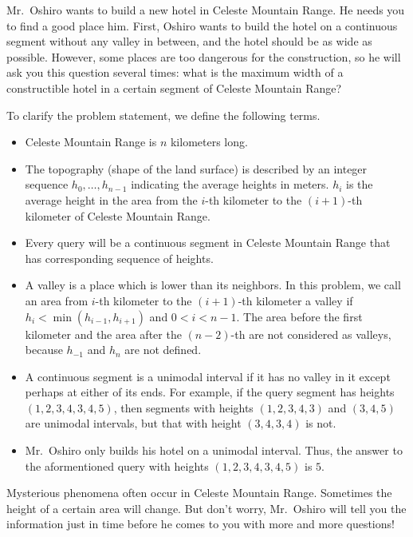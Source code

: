 Mr.\ Oshiro wants to build a new hotel in Celeste Mountain Range.
He needs you to find a good place him. 
First, Oshiro wants to build the hotel on a continuous segment 
without any valley in between,
and the hotel should be as wide as possible. 
However, some places are too dangerous for the construction, 
so he will ask you this question several times: 
what is the maximum width of a constructible hotel 
in a certain segment of Celeste Mountain Range?

To clarify the problem statement, we define the following terms.
\begin{itemize}
\item Celeste Mountain Range is $n$ kilometers long.
\item The topography (shape of the land surface) is described by an 
      integer sequence $h_0,\dots,h_{n-1}$ indicating the average heights in 
      meters. $h_i$ is the average height in the area from the $i$-th kilometer
      to the $(i+1)$-th kilometer of Celeste Mountain Range. 
\item Every query will be a continuous segment in Celeste Mountain Range
      that has corresponding sequence of heights.
\item A valley is a place which is lower than its neighbors. In this problem,
      we call an area from $i$-th kilometer to the $(i+1)$-th kilometer 
      a valley if $h_i<\min(h_{i-1},h_{i+1})$ and $0<i<n-1$. 
      The area before the first kilometer and the area after the $(n-2)$-th 
      are not considered as valleys, because $h_{-1}$ and ${h_n}$ are
      not defined.
\item A continuous segment is a unimodal interval if it has no valley in it
      except perhaps at either of its ends. 
      For example, if the query segment has heights $(1,2,3,4,3,4,5)$,
      then segments with heights $(1,2,3,4,3)$ and $(3,4,5)$ are unimodal 
      intervals, but that with height $(3,4,3,4)$ is not. 
\item Mr.\ Oshiro only builds his hotel on a unimodal interval. Thus, the 
      answer to the aformentioned query with heights $(1,2,3,4,3,4,5)$ is $5$.
\end{itemize}

Mysterious phenomena often occur in Celeste Mountain Range. 
Sometimes the height of a certain area will change. 
But don't worry, Mr.\ Oshiro will tell you the information just in time 
before he comes to you with more and more questions! 
